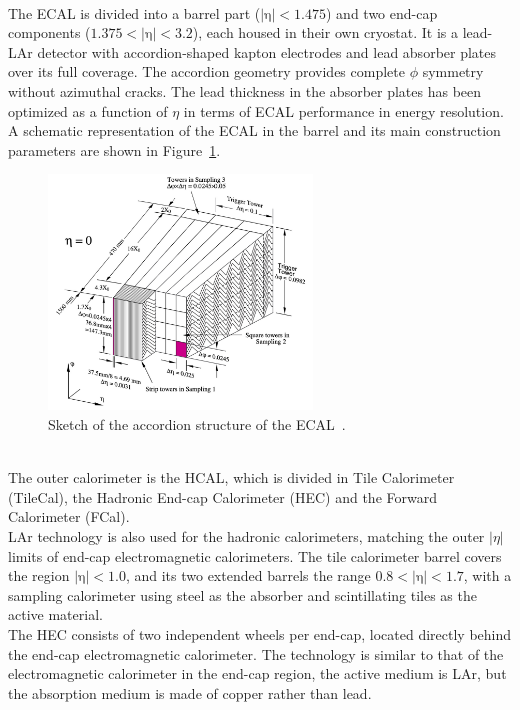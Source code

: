 \vspace{\baselineskip}
\\The ECAL is divided into a barrel part ($\mathrm{|\eta|<1.475}$) and two end-cap components ($\mathrm{1.375<|\eta|<3.2}$), each housed in their own cryostat.
It is a lead-LAr detector with accordion-shaped kapton electrodes and lead absorber plates over its full coverage. The accordion geometry provides complete $\phi$ symmetry without azimuthal cracks.
The lead thickness in the absorber plates has been optimized as a function of $\eta$ in terms of ECAL performance in energy resolution. 
\\A schematic representation of the ECAL in the barrel and its main construction parameters are shown in Figure~\ref{fig:ECAL}. 
\begin{figure}[h]
	\centering
	\includegraphics[width=7cm]{Chapters/CH2/figures/ECAL}
	\caption{Sketch of the accordion structure of the ECAL~\cite{cal}.}
	\label{fig:ECAL}
\end{figure}
\vspace{\baselineskip}
\\The outer calorimeter is the HCAL, which is divided in Tile Calorimeter (TileCal), the Hadronic End-cap Calorimeter (HEC) and the Forward Calorimeter (FCal). \\
LAr technology is also used for the hadronic calorimeters, matching the outer $|\eta|$ limits of end-cap electromagnetic calorimeters. 
The tile calorimeter barrel covers the region $\mathrm{|\eta|<1.0}$, and its two extended barrels the range $\mathrm{0.8<|\eta|<1.7}$, with a sampling calorimeter 
using steel as the absorber and scintillating tiles as the active material.\\
The HEC consists of two independent wheels per end-cap, located directly behind the end-cap electromagnetic calorimeter. The technology is similar to that of the 
electromagnetic calorimeter in the end-cap region, the active medium is LAr, but the absorption medium is made of copper rather than lead.
